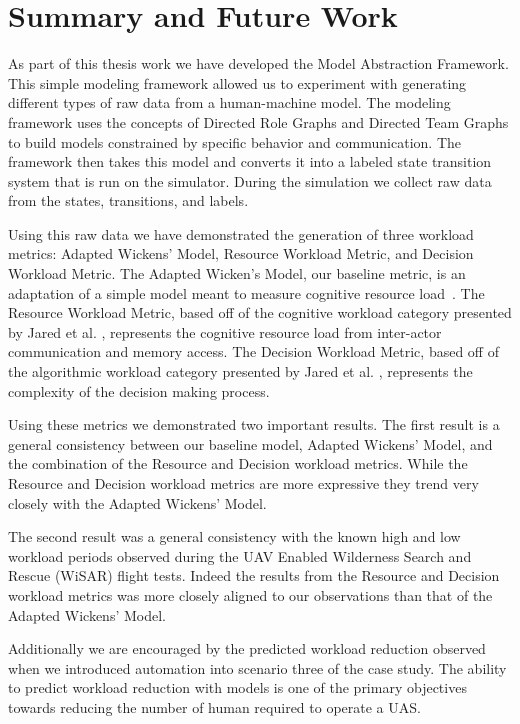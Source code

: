 \chapter{Summary and Future Work} \label{ch:summary}

As part of this thesis work we have developed the Model Abstraction Framework.  This simple modeling framework allowed us to experiment with generating different types of raw data from a human-machine model.  The modeling framework uses the concepts of Directed Role Graphs and Directed Team Graphs to build models constrained by specific behavior and communication.  The framework then takes this model and converts it into a labeled state transition system that is run on the simulator.  During the simulation we collect raw data from the states, transitions, and labels.

Using this raw data we have demonstrated the generation of three workload metrics: Adapted Wickens' Model, Resource Workload Metric, and Decision Workload Metric.  The Adapted Wicken's Model, our baseline metric, is an adaptation of a simple model meant to measure cognitive resource load~\cite{wickens2002multiple}.  The Resource Workload Metric, based off of the cognitive workload category presented by Jared et al. \cite{moore2014modeling}, represents the cognitive resource load from inter-actor communication and memory access.  The Decision Workload Metric, based off of the algorithmic workload category presented by Jared et al. \cite{moore2014modeling}, represents the complexity of the decision making process.

Using these metrics we demonstrated two important results.  The first result is a general consistency between our baseline model, Adapted Wickens' Model, and the combination of the Resource and Decision workload metrics.  While the Resource and Decision workload metrics are more expressive they trend very closely with the Adapted Wickens' Model.

The second result was a general consistency with the known high and low workload periods observed during the UAV Enabled Wilderness Search and Rescue (WiSAR) flight tests.  Indeed the results from the Resource and Decision workload metrics was more closely aligned to our observations than that of the Adapted Wickens' Model.

Additionally we are encouraged by the predicted workload reduction observed when we introduced automation into scenario three of the case study.  The ability to predict workload reduction with models is one of the primary objectives towards reducing the number of human required to operate a UAS.

